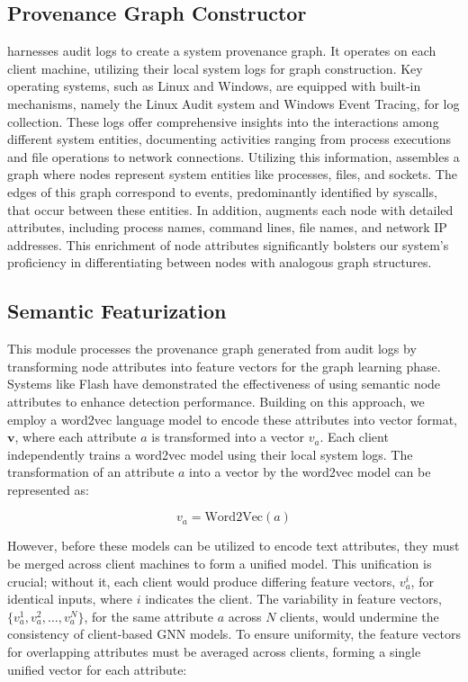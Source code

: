 \subsection{Provenance Graph Constructor} 
\Sys harnesses audit logs to create a system provenance graph. It operates on each client machine, utilizing their local system logs for graph construction. Key operating systems, such as Linux and Windows, are equipped with built-in mechanisms, namely the Linux Audit system and Windows Event Tracing, for log collection. These logs offer comprehensive insights into the interactions among different system entities, documenting activities ranging from process executions and file operations to network connections. Utilizing this information, \Sys assembles a graph where nodes represent system entities like processes, files, and sockets. The edges of this graph correspond to events, predominantly identified by syscalls, that occur between these entities. In addition, \Sys augments each node with detailed attributes, including process names, command lines, file names, and network IP addresses. This enrichment of node attributes significantly bolsters our system's proficiency in differentiating between nodes with analogous graph structures.

\subsection{Semantic Featurization}

This module processes the provenance graph generated from audit logs by transforming node attributes into feature vectors for the graph learning phase. Systems like Flash have demonstrated the effectiveness of using semantic node attributes to enhance detection performance. Building on this approach, we employ a word2vec language model to encode these attributes into vector format, \(\mathbf{v}\), where each attribute \(a\) is transformed into a vector \(v_a\). Each client independently trains a word2vec model using their local system logs. The transformation of an attribute \(a\) into a vector by the word2vec model can be represented as:

\[
v_a = \text{Word2Vec}(a)
\]

However, before these models can be utilized to encode text attributes, they must be merged across client machines to form a unified model. This unification is crucial; without it, each client would produce differing feature vectors, \(v_a^i\), for identical inputs, where \(i\) indicates the client. The variability in feature vectors, \(\{v_a^1, v_a^2, \ldots, v_a^N\}\), for the same attribute \(a\) across \(N\) clients, would undermine the consistency of client-based GNN models. To ensure uniformity, the feature vectors for overlapping attributes must be averaged across clients, forming a single unified vector for each attribute:

